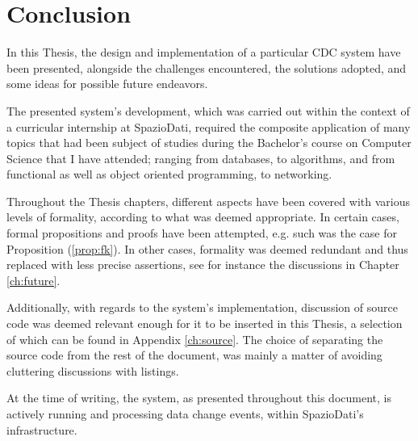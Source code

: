 \chapter{Conclusion}
\label{ch:conclusion}

In this Thesis, the design and implementation of a particular CDC system have been presented, alongside the challenges encountered, the solutions adopted, and some ideas for possible future endeavors.

The presented system's development, which was carried out within the context of a curricular internship at SpazioDati, required the composite application of many topics that had been subject of studies during the Bachelor's course on Computer Science that I have attended; ranging from databases, to algorithms, and from functional as well as object oriented programming, to networking.

Throughout the Thesis chapters, different aspects have been covered with various levels of formality, according to what was deemed appropriate.
In certain cases, formal propositions and proofs have been attempted, e.g. such was the case for Proposition (\ref{prop:fk}).
In other cases, formality was deemed redundant and thus replaced with less precise assertions, see for instance the discussions in Chapter \ref{ch:future}.

Additionally, with regards to the system's implementation, discussion of source code was deemed relevant enough for it to be inserted in this Thesis, a selection of which can be found in Appendix \ref{ch:source}.
The choice of separating the source code from the rest of the document, was mainly a matter of avoiding cluttering discussions with listings.

At the time of writing, the system, as presented throughout this document, is actively running and processing data change events, within SpazioDati's infrastructure.

